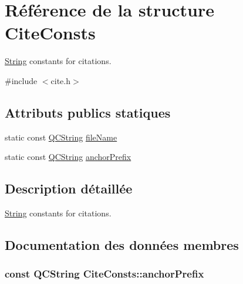 \hypertarget{struct_cite_consts}{}\section{Référence de la structure Cite\+Consts}
\label{struct_cite_consts}


\hyperlink{class_string}{String} constants for citations.  




{\ttfamily \#include $<$cite.\+h$>$}

\subsection*{Attributs publics statiques}
\begin{DoxyCompactItemize}
\item 
static const \hyperlink{class_q_c_string}{Q\+C\+String} \hyperlink{struct_cite_consts_a76380abd8266f8b5e41511f70166f4dd}{file\+Name}
\item 
static const \hyperlink{class_q_c_string}{Q\+C\+String} \hyperlink{struct_cite_consts_a1678a77efc499bf1a641ec5d04a5c41e}{anchor\+Prefix}
\end{DoxyCompactItemize}


\subsection{Description détaillée}
\hyperlink{class_string}{String} constants for citations. 

\subsection{Documentation des données membres}
\hypertarget{struct_cite_consts_a1678a77efc499bf1a641ec5d04a5c41e}{}
\subsubsection[{anchor\+Prefix}]{\setlength{\rightskip}{0pt plus 5cm}const {\bf Q\+C\+String} Cite\+Consts\+::anchor\+Prefix\hspace{0.3cm}{\ttfamily [static]}}\label{struct_cite_consts_a1678a77efc499bf1a641ec5d04a5c41e}
\hypertarget{struct_cite_consts_a76380abd8266f8b5e41511f70166f4dd}{}
